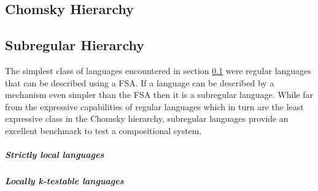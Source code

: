 \subsection{Chomsky Hierarchy}\label{flt:ch}
\blindtext

\subsection{Subregular Hierarchy}\label{flt:sh}
The simplest class of languages encountered in section \ref{flt:ch} were regular languages that can be described using a FSA. If a language can be described by a mechanism even simpler than the FSA then it is a subregular language. While far from the expressive capabilities of regular languages which in turn are the least expressive class in the Chomsky hierarchy, subregular languages provide an excellent benchmark to test a compositional system.

\subparagraph{Strictly local languages}

\subparagraph{Locally k-testable languages}



